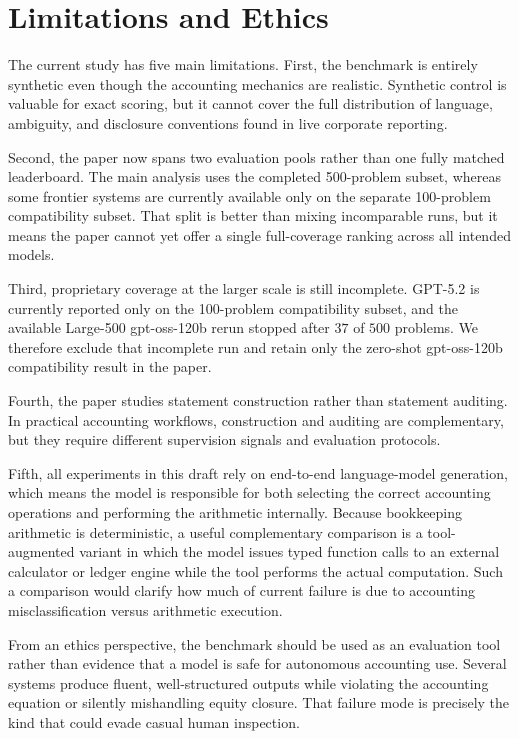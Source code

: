 \section{Limitations and Ethics}

The current study has five main limitations.
First, the benchmark is entirely synthetic even though the accounting
mechanics are realistic.
Synthetic control is valuable for exact scoring, but it cannot cover
the full distribution of language, ambiguity, and disclosure
conventions found in live corporate reporting.

Second, the paper now spans two evaluation pools rather than one fully
matched leaderboard.
The main analysis uses the completed 500-problem subset, whereas some
frontier systems are currently available only on the separate
100-problem compatibility subset.
That split is better than mixing incomparable runs, but it means the
paper cannot yet offer a single full-coverage ranking across all
intended models.

Third, proprietary coverage at the larger scale is still incomplete.
GPT-5.2 is currently reported only on the 100-problem compatibility
subset, and the available Large-500 gpt-oss-120b \CoT{} rerun stopped
after \(37\) of \(500\) problems.
We therefore exclude that incomplete run and retain only the
zero-shot gpt-oss-120b compatibility result in the paper.

Fourth, the paper studies statement construction rather than statement
auditing.
In practical accounting workflows, construction and auditing are
complementary, but they require different supervision signals and
evaluation protocols.

Fifth, all experiments in this draft rely on end-to-end language-model
generation, which means the model is responsible for both selecting the
correct accounting operations and performing the arithmetic internally.
Because bookkeeping arithmetic is deterministic, a useful complementary
comparison is a tool-augmented variant in which the model issues typed
function calls to an external calculator or ledger engine while the tool
performs the actual computation.
Such a comparison would clarify how much of current failure is due to
accounting misclassification versus arithmetic execution.

From an ethics perspective, the benchmark should be used as an
evaluation tool rather than evidence that a model is safe for autonomous
accounting use.
Several systems produce fluent, well-structured outputs while violating
the accounting equation or silently mishandling equity closure.
That failure mode is precisely the kind that could evade casual human
inspection.

